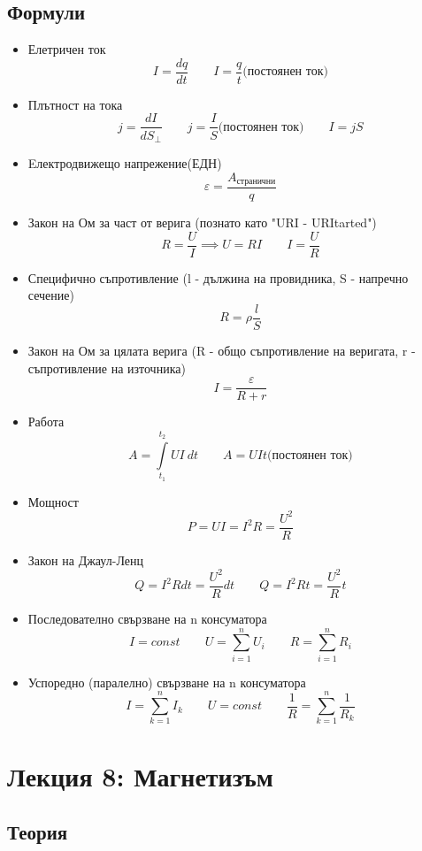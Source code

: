 \documentclass[fleqn, 12pt]{article}
\theoremstyle{definition}
\begin{document}
\subsection{Формули}
\begin{itemize}
\item Елетричен ток 
$$I = \frac{dq}{dt} \qquad I = \frac{q}{t} \text{(постоянен ток)}$$
\item Плътност на тока 
$$j = \frac{dI}{dS_{\perp}} \qquad j = \frac{I}{S} \text{(постоянен ток)} \qquad I = jS$$
\item Eлектродвижещо напрежение(ЕДН) 
$$\varepsilon = \frac{A_{\text{странични}}}{q}$$
\item Закон на Ом за част от верига (познато като "URI - URItarted")
$$R = \frac{U}{I} \implies U=RI \qquad I = \frac{U}{R}$$
\item Специфично съпротивление (l - дължина на провидника, S - напречно сечение)
$$R = \rho \frac{l}{S}$$
\item Закон на Ом за цялата верига (R - общо съпротивление на веригата, r - съпротивление на източника)
$$I = \frac{\varepsilon}{R + r}$$
\item Работа 
$$A = \int\limits_{t_1} ^{t_2} UI \ dt \qquad A = UIt \text{(постоянен ток)}$$
\item Мощност
$$P = UI = I^2R = \frac{U^2}{R}$$
\item Закон на Джаул-Ленц
$$Q = I^2Rdt = \frac{U^2}{R} dt \qquad Q = I^2Rt = \frac{U^2}{R}t $$
\item Последователно свързване на n консуматора
$$I = const \qquad U = \sum_{i=1} ^n U_i  \qquad R = \sum_{i=1} ^n R_i$$
\item Успоредно (паралелно) свързване на n консуматора 
$$I = \sum_{k=1} ^n I_k \qquad U = const \qquad \frac{1}{R} = \sum_{k=1} ^n \frac{1}{R_k}$$
\end{itemize}

\newpage
\section{Лекция 8: Магнетизъм}

\subsection{Теория}
\end{document}

